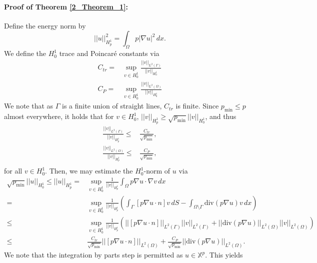 \documentclass[oneside]{article}
\begin{document}
\paragraph{Proof of Theorem \ref{2_Theorem_1}:} Define the energy norm by 
$$
||u||_{H^1_p}^2=\int_\Omega p|\nabla u|^2\,dx. 
$$
We define the $H^1_0$ trace and Poincar\'e constants via 
\begin{equation}
\begin{split}
C_{tr}=& \sup\limits_{v\in H^1_0}\frac{||v||_{L^2(\Gamma)}}{||v||_{H^1_0}}\\
C_P = &\sup\limits_{v\in H^1_0}\frac{||v||_{L^2(\Omega)}}{||v||_{H^1_0}}
\end{split}
\end{equation}
We note that as $\Gamma$ is a finite union of straight lines, $C_{tr}$ is finite. Since $p_{\min}\leq p$ almost everywhere, it holds that for $v\in H^1_0$, $||v||_{H^1_p}\geq \sqrt{p_{\min}}||v||_{H^1_0}$, and thus
\begin{equation}
\begin{split}
\frac{||v||_{L^2(\Gamma)}}{||v||_{H^1_p}}\leq &\frac{C_{tr}}{\sqrt{p_{\min}}},\\
\frac{||v||_{L^2(\Omega)}}{||v||_{H^1_p}}\leq &\frac{C_P}{\sqrt{p_{\min}}},\\
\end{split}
\end{equation}
for all $v\in H^1_0$. Then, we may estimate the $H^1_0$-norm of $u$ via
\begin{equation}
\begin{split}
\sqrt{p_{\min}}||u||_{H^1_0}\leq ||u||_{H^1_p}=&\sup\limits_{v\in H^1_0}\frac{1}{||v||_{H^1_p}}\int_\Omega p\nabla u\cdot \nabla v\,dx\\
=&\sup\limits_{v\in H^1_0}\frac{1}{||v||_{H^1_p}}\left(\int_{\Gamma}[p\nabla u\cdot n]v\,dS -\int_{\Omega\setminus \Gamma} \text{div}(p\nabla u)v\,dx\right)\\
\leq & \sup\limits_{v\in H^1_0}\frac{1}{||v||_{H^1_p}}\left(||[p\nabla u\cdot n]||_{L^2(\Gamma)}||v||_{L^2(\Gamma)}+||\text{div}(p\nabla u)||_{L^2(\Omega)}||v||_{L^2(\Omega)}\right)\\
\leq & \frac{C_{tr}}{\sqrt{p_{\min}}}||[p\nabla u\cdot n]||_{L^2(\Omega)}+\frac{C_P}{\sqrt{p_{\min}}}||\text{div}(p\nabla u)||_{L^2(\Omega)}. 
\end{split}
\end{equation}
We note that the integration by parts step is permitted as $u\in \mathbb{X}^p$. This yields 
\end{document}
